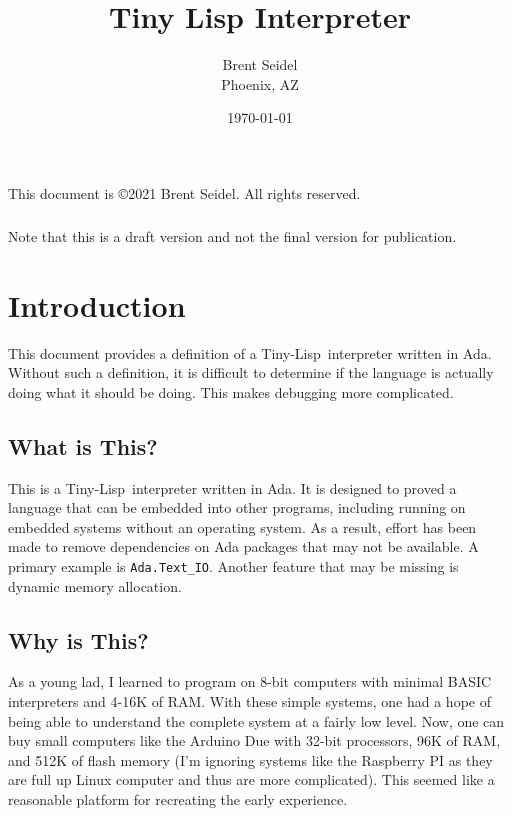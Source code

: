 \documentclass[10pt, openany]{book}
\title{Tiny Lisp Interpreter}
\author{Brent Seidel \\ Phoenix, AZ}
\date{ \today }
\newcommand{\package}[1]{\texttt{#1}}
\newcommand{\tl}{Tiny-Lisp}
\begin{document}
%
%
\frontmatter
\maketitle
\begin{center}
This document is \copyright 2021 Brent Seidel.  All rights reserved.

\paragraph{}Note that this is a draft version and not the final version for publication.
\end{center}
\tableofcontents

\mainmatter
\chapter{Introduction}
This document provides a definition of a \tl\ interpreter written in Ada.  Without such a definition, it is difficult to determine if the language is actually doing what it should be doing.  This makes debugging more complicated.

\section{What is This?}
This is a \tl\ interpreter written in Ada.  It is designed to proved a language that can be embedded into other programs, including running on embedded systems without an operating system.  As a result, effort has been made to remove dependencies on Ada packages that may not be available.  A primary example is \package{Ada.Text\_IO}.  Another feature that may be missing is dynamic memory allocation.

\section{Why is This?}
As a young lad, I learned to program on 8-bit computers with minimal BASIC interpreters and 4-16K of RAM.  With these simple systems, one had a hope of being able to understand the complete system at a fairly low level.  Now, one can buy small computers like the Arduino Due with 32-bit processors, 96K of RAM, and 512K of flash memory (I'm ignoring systems like the Raspberry PI as they are full up Linux computer and thus are more complicated).  This seemed like a reasonable platform for recreating the early experience.
\end{document}
